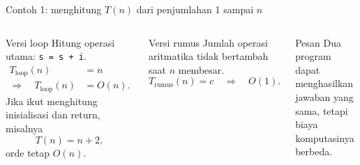 \documentclass[aspectratio=169,11pt]{beamer}
\begin{document}
\begin{frame}{Contoh 1: menghitung $T(n)$ dari penjumlahan 1 sampai $n$}
\begin{columns}[T]
\begin{block}{Versi loop}
Hitung operasi utama: \texttt{s = s + i}.
\[
\begin{aligned}
T_{\text{loop}}(n) &= n \\
\Rightarrow \quad T_{\text{loop}}(n) &= O(n).
\end{aligned}
\]
Jika ikut menghitung inisialisasi dan return, misalnya
\[
T(n)=n+2,
\]
orde tetap $O(n)$.
\end{block}
\begin{block}{Versi rumus}
Jumlah operasi aritmatika tidak bertambah saat $n$ membesar.
\[
T_{\text{rumus}}(n)=c
\quad \Rightarrow \quad O(1).
\]
\end{block}
\pause
\begin{alertblock}{Pesan}
Dua program dapat menghasilkan jawaban yang sama, tetapi biaya komputasinya berbeda.
\end{alertblock}
\end{columns}
\end{frame}
\end{document}
